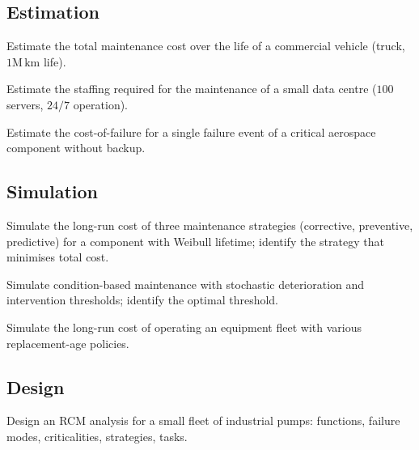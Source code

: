 \subsection*{Estimation}

\begin{exercise}
Estimate the total maintenance cost over the life of a commercial vehicle (truck, $1\text{M}\,\text{km}$ life).
\end{exercise}

\begin{exercise}
Estimate the staffing required for the maintenance of a small data centre ($100$ servers, $24/7$ operation).
\end{exercise}

\begin{exercise}
Estimate the cost-of-failure for a single failure event of a critical aerospace component without backup.
\end{exercise}

\subsection*{Simulation}

\begin{exercise}
Simulate the long-run cost of three maintenance strategies (corrective, preventive, predictive) for a component with Weibull lifetime; identify the strategy that minimises total cost.
\end{exercise}

\begin{exercise}
Simulate condition-based maintenance with stochastic deterioration and intervention thresholds; identify the optimal threshold.
\end{exercise}

\begin{exercise}
Simulate the long-run cost of operating an equipment fleet with various replacement-age policies.
\end{exercise}

\subsection*{Design}

\begin{exercise}
Design an RCM analysis for a small fleet of industrial pumps: functions, failure modes, criticalities, strategies, tasks.
\end{exercise}

